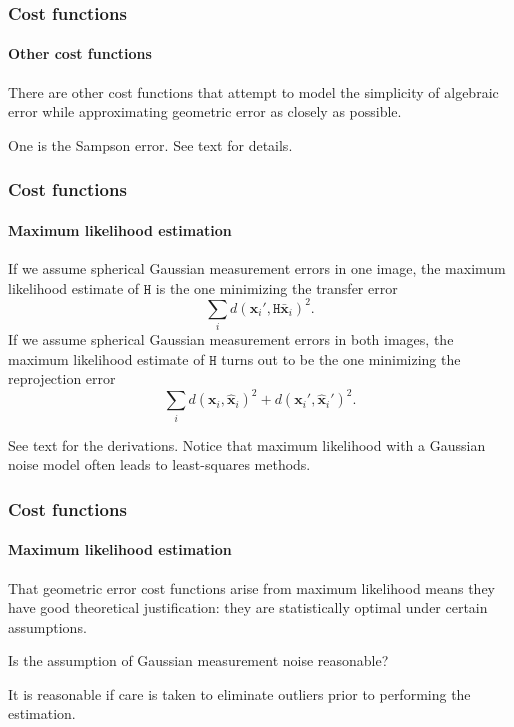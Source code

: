 \documentclass[aspectratio=169]{beamer}
\renewcommand{\vec}[1]{\boldsymbol{#1}}
\newcommand{\mat}[1]{\mathtt{#1}}
\begin{document}
\begin{frame}
\frametitle{Cost functions}
\framesubtitle{Other cost functions}

There are other cost functions that attempt to model the simplicity of
algebraic error while approximating geometric error as closely as
possible.

\medskip

One is the \alert{Sampson error}.  See text for details.

\end{frame}

\begin{frame}
\frametitle{Cost functions}
\framesubtitle{Maximum likelihood estimation}

If we assume spherical Gaussian measurement errors in \alert{one} image, the
\alert{maximum likelihood estimate} of $\mat{H}$ is the one minimizing
the \alert{transfer error}
\begin{equation*}
\sum_i d(\vec{x}_i',\mat{H}\bar{\vec{x}}_i)^2.
\end{equation*}
If we assume spherical Gaussian measurement errors in \alert{both} images, the
maximum likelihood estimate of $\mat{H}$ turns out to be the one
minimizing the \alert{reprojection error}
\begin{equation*}
\sum_i
d(\vec{x}_i,\hat{\vec{x}}_i)^2+d(\vec{x}_i',\hat{\vec{x}}_i')^2.
\end{equation*}

\medskip

See text for the derivations.  Notice that maximum likelihood with a
Gaussian noise model often leads to least-squares methods.

\end{frame}

\begin{frame}
\frametitle{Cost functions}
\framesubtitle{Maximum likelihood estimation}

That geometric error cost functions arise from maximum likelihood
means they have good theoretical justification: they are
\alert{statistically optimal} under certain assumptions.

\medskip

Is the assumption of \alert{Gaussian measurement noise} reasonable?

\medskip

It is reasonable if care is taken to \alert{eliminate outliers} prior
to performing the estimation.

\end{frame}
\end{document}
